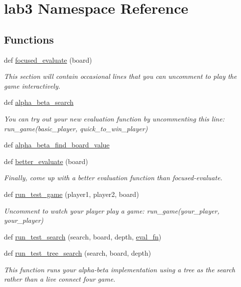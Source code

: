 \hypertarget{namespacelab3}{}\section{lab3 Namespace Reference}
\label{namespacelab3}
\subsection*{Functions}
\begin{DoxyCompactItemize}
\item 
def \hyperlink{namespacelab3_abda076f73dc12e63d20dbdcb5954a6ed}{focused\+\_\+evaluate} (board)
\begin{DoxyCompactList}\small\item\em This section will contain occasional lines that you can uncomment to play the game interactively. \end{DoxyCompactList}\item 
def \hyperlink{namespacelab3_a7ead0dd82f5946316600e9a937e55037}{alpha\+\_\+beta\+\_\+search}
\begin{DoxyCompactList}\small\item\em You can try out your new evaluation function by uncommenting this line\+: run\+\_\+game(basic\+\_\+player, quick\+\_\+to\+\_\+win\+\_\+player) \end{DoxyCompactList}\item 
def \hyperlink{namespacelab3_a30824a87848607d82381e77631ca275b}{alpha\+\_\+beta\+\_\+find\+\_\+board\+\_\+value}
\item 
def \hyperlink{namespacelab3_ad4559f27d37b36fa9a2190308c28174a}{better\+\_\+evaluate} (board)
\begin{DoxyCompactList}\small\item\em Finally, come up with a better evaluation function than focused-\/evaluate. \end{DoxyCompactList}\item 
def \hyperlink{namespacelab3_a34296327d4f1f67dfca5302d2ff4751c}{run\+\_\+test\+\_\+game} (player1, player2, board)
\begin{DoxyCompactList}\small\item\em Uncomment to watch your player play a game\+: run\+\_\+game(your\+\_\+player, your\+\_\+player) \end{DoxyCompactList}\item 
def \hyperlink{namespacelab3_ae1b04090543255fa707de5abb7410a35}{run\+\_\+test\+\_\+search} (search, board, depth, \hyperlink{namespacelab3_aef5722d14d422222f997cff6cd66564f}{eval\+\_\+fn})
\item 
def \hyperlink{namespacelab3_af9aef6e2b8254c91f1ffb4dad0f99de5}{run\+\_\+test\+\_\+tree\+\_\+search} (search, board, depth)
\begin{DoxyCompactList}\small\item\em This function runs your alpha-\/beta implementation using a tree as the search rather than a live connect four game. \end{DoxyCompactList}\end{DoxyCompactItemize}
